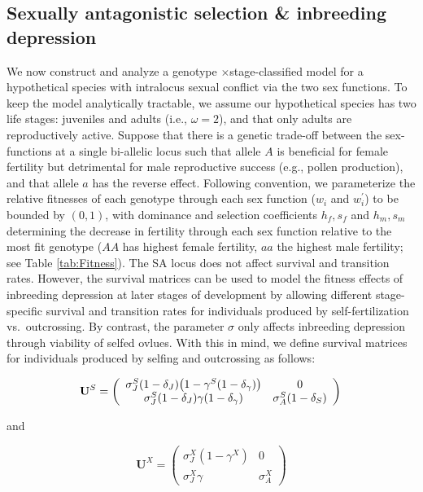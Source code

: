 \documentclass[11pt]{article}
\def\mbf#1{\mathbf{#1}}
\begin{document}
\subsection*{Sexually antagonistic selection \& inbreeding depression} \label{sec:SAsel}

We now construct and analyze a genotype $\times$stage-classified model for a hypothetical species with intralocus sexual conflict via the two sex functions. To keep the model analytically tractable, we assume our hypothetical species has two life stages: juveniles and adults (i.e., $\omega = 2$), and that only adults are reproductively active. Suppose that there is a genetic trade-off between the sex-functions at a single bi-allelic locus such that allele $A$ is beneficial for female fertility but detrimental for male reproductive success (e.g., pollen production), and that allele $a$ has the reverse effect. Following convention, we parameterize the relative fitnesses of each genotype through each sex function ($w_{i}$ and $w^{\prime}_{i}$) to be bounded by $(0,1)$, with dominance and selection coefficients $h_f, s_f$ and $h_m, s_m$ determining the decrease in fertility through each sex function relative to the most fit genotype ($AA$ has highest female fertility, $aa$ the highest male fertility; see Table \ref{tab:Fitness}). The SA locus does not affect survival and transition rates. However, the survival matrices can be used to model the fitness effects of inbreeding depression at later stages of development by allowing different stage-specific survival and transition rates for individuals produced by self-fertilization vs.~outcrossing. By contrast, the parameter $\sigma$ only affects inbreeding depression through viability of selfed ovlues. With this in mind, we define survival matrices for individuals produced by selfing and outcrossing as follows:
\begin{linenomath*}
\begin{equation} \label{eq:US}
	\mbf{U}^S = \left(
					\begin{array}{cc}
						\sigma^S_J (1 - \delta_J) \big(1 - \gamma^S (1 - \delta_{\gamma}) \big) & 0 \\
						\sigma^S_J (1 - \delta_J) \gamma (1 - \delta_{\gamma})      & \sigma^S_A (1 - \delta_S)
					\end{array}
				\right) \\
\end{equation}
\end{linenomath*}
\noindent and 
\begin{linenomath*}
\begin{equation}\label{eq:UX}
	\mbf{U}^X = \left(
					\begin{array}{cc}
						\sigma^X_J(1 - \gamma^X) & 0 \\
						\sigma^X_J \gamma      & \sigma^X_A
					\end{array}
				\right)
\end{equation}
\end{linenomath*}
\end{document}
